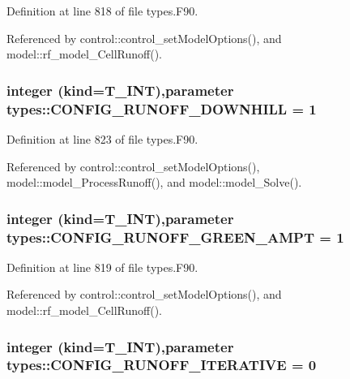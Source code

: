 Definition at line 818 of file types.F90.



Referenced by control::control\_\-setModelOptions(), and model::rf\_\-model\_\-CellRunoff().

\hypertarget{namespacetypes_afd1849eb3a3e616a3da9bee8064421fc}{
\subsubsection[{CONFIG\_\-RUNOFF\_\-DOWNHILL}]{\setlength{\rightskip}{0pt plus 5cm}integer (kind={\bf T\_\-INT}),parameter {\bf types::CONFIG\_\-RUNOFF\_\-DOWNHILL} = 1}}
\label{namespacetypes_afd1849eb3a3e616a3da9bee8064421fc}


Definition at line 823 of file types.F90.



Referenced by control::control\_\-setModelOptions(), model::model\_\-ProcessRunoff(), and model::model\_\-Solve().

\hypertarget{namespacetypes_a95bb0084d2d95f85aaaf43581e2b0c43}{
\subsubsection[{CONFIG\_\-RUNOFF\_\-GREEN\_\-AMPT}]{\setlength{\rightskip}{0pt plus 5cm}integer (kind={\bf T\_\-INT}),parameter {\bf types::CONFIG\_\-RUNOFF\_\-GREEN\_\-AMPT} = 1}}
\label{namespacetypes_a95bb0084d2d95f85aaaf43581e2b0c43}


Definition at line 819 of file types.F90.



Referenced by control::control\_\-setModelOptions(), and model::rf\_\-model\_\-CellRunoff().

\hypertarget{namespacetypes_a7feb2433c90e8248bbe69792c9b67712}{
\subsubsection[{CONFIG\_\-RUNOFF\_\-ITERATIVE}]{\setlength{\rightskip}{0pt plus 5cm}integer (kind={\bf T\_\-INT}),parameter {\bf types::CONFIG\_\-RUNOFF\_\-ITERATIVE} = 0}}
\label{namespacetypes_a7feb2433c90e8248bbe69792c9b67712}


